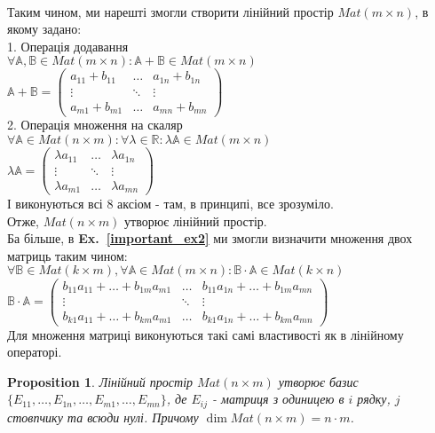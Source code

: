 \documentclass[a4paper, 10pt]{article}
\theoremstyle{theoremdd}
\newtheorem{proposition}[theorem]{Proposition}
\newcommand\exref[1]{\textbf{Ex.~\ref{#1}}}
\begin{document}
	\bigskip \\
	Таким чином, ми нарешті змогли створити лінійний простір $Mat(m \times n)$, в якому задано:\\
	1. Операція додавання\\
	$\forall \mathbb{A}, \mathbb{B} \in Mat(m \times n): \mathbb{A} + \mathbb{B} \in Mat(m \times n)$\\
	$\mathbb{A} + \mathbb{B} = \begin{pmatrix}
	a_{11} + b_{11} & \dots & a_{1n} + b_{1n} \\
	\vdots & \ddots & \vdots \\
	a_{m1} + b_{m1} & \dots & a_{mn} + b_{mn}
	\end{pmatrix}$\\
	2. Операція множення на скаляр\\
	$\forall \mathbb{A} \in Mat(n \times m): \forall \lambda \in \mathbb{R}: \lambda \mathbb{A} \in Mat(m \times n)$\\
	$\lambda \mathbb{A} = \begin{pmatrix}
	\lambda a_{11} & \dots & \lambda a_{1n}\\
	\vdots & \ddots & \vdots \\
	\lambda a_{m1} & \dots & \lambda a_{mn}
	\end{pmatrix}$\\
	І виконуються всі 8 аксіом - там, в принципі, все зрозуміло.\\
	Отже, $Mat (n \times m)$ утворює лінійний простір.
	\bigskip \\
	Ба більше, в \exref{important_ex2} ми змогли визначити множення двох матриць таким чином:\\
	$\forall \mathbb{B} \in Mat(k \times m), \forall \mathbb{A} \in Mat(m \times n): \mathbb{B} \cdot \mathbb{A} \in Mat(k \times n)$\\
	$\mathbb{B} \cdot \mathbb{A} = \begin{pmatrix}
	b_{11}a_{11}+\dots+b_{1m}a_{m1} & \dots & b_{11}a_{1n}+\dots+b_{1m}a_{mn} \\
	\vdots & \ddots & \vdots \\
	b_{k1}a_{11} + \dots + b_{km}a_{m1} & \dots & b_{k1}a_{1n} + \dots + b_{km}a_{mn} 
	\end{pmatrix}$\\
	Для множення матриці виконуються такі самі властивості як в лінійному операторі.
	
	\begin{proposition}
	Лінійний простір $Mat(n \times m)$ утворює базис $\{E_{11},\dots, E_{1n},\dots, E_{m1}, \dots, E_{mn}\}$, де $E_{ij}$ - матриця з одиницею в $i$ рядку, $j$ стовпчику та всюди нулі. Причому $\dim Mat (n \times m) = n \cdot m$.
	\end{proposition}
	
\end{document}

